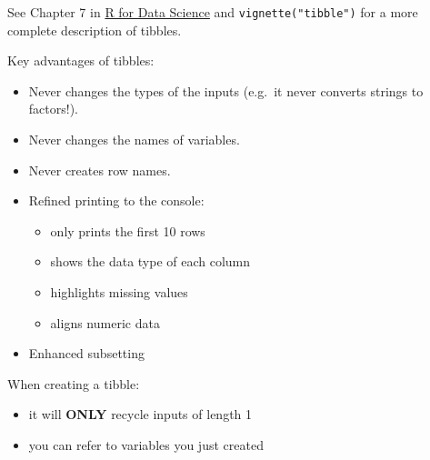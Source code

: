 \documentclass[]{book}
\providecommand{\tightlist}{%
  \setlength{\itemsep}{0pt}\setlength{\parskip}{0pt}}
\let\BeginKnitrBlock\begin \let\EndKnitrBlock\end
\begin{document}
\BeginKnitrBlock{rmdimportant}
See Chapter 7 in \href{http://r4ds.had.co.nz/tibbles.html}{R for Data
Science} and \texttt{vignette("tibble")} for a more complete description
of tibbles.
\EndKnitrBlock{rmdimportant}

Key advantages of tibbles:

\begin{itemize}
\tightlist
\item
  Never changes the types of the inputs (e.g.~it never converts strings
  to factors!).
\item
  Never changes the names of variables.
\item
  Never creates row names.
\item
  Refined printing to the console:

  \begin{itemize}
  \tightlist
  \item
    only prints the first 10 rows
  \item
    shows the data type of each column
  \item
    highlights missing values
  \item
    aligns numeric data
  \end{itemize}
\item
  Enhanced subsetting
\end{itemize}

When creating a tibble:

\begin{itemize}
\tightlist
\item
  it will \textbf{ONLY} recycle inputs of length 1
\item
  you can refer to variables you just created
\end{itemize}
\end{document}
